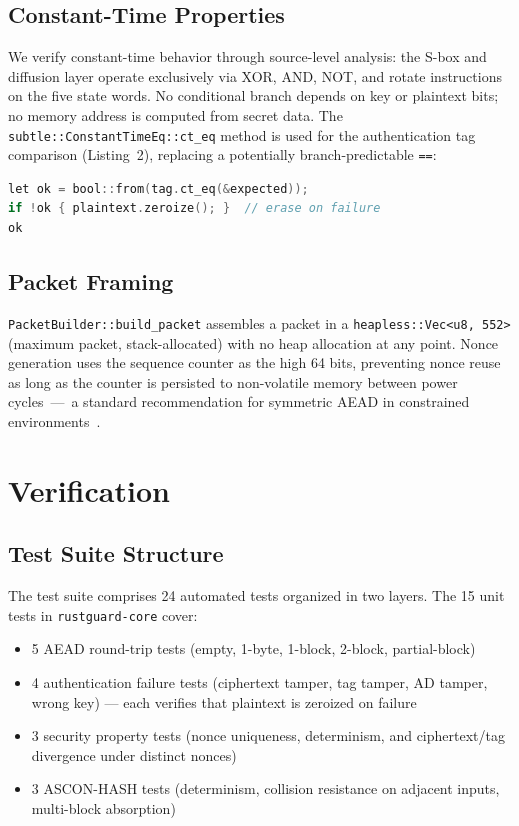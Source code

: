\documentclass[conference]{IEEEtran}
\begin{document}
\subsection{Constant-Time Properties}

We verify constant-time behavior through source-level analysis:
the S-box and diffusion layer operate exclusively via XOR, AND, NOT, and
rotate instructions on the five state words. No conditional branch depends on
key or plaintext bits; no memory address is computed from secret data.
The \texttt{subtle::ConstantTimeEq::ct\_eq} method is used for the
authentication tag comparison (Listing~2), replacing a
potentially branch-predictable \texttt{==}:

\begin{lstlisting}[language=C,caption={Constant-time tag verification.}]
let ok = bool::from(tag.ct_eq(&expected));
if !ok { plaintext.zeroize(); }  // erase on failure
ok
\end{lstlisting}

\subsection{Packet Framing}

\texttt{PacketBuilder::build\_packet} assembles a packet in a
\texttt{heapless::Vec<u8, 552>} (maximum packet, stack-allocated) with no
heap allocation at any point. Nonce generation uses the sequence counter as
the high 64 bits, preventing nonce reuse as long as the counter is persisted
to non-volatile memory between power cycles~---~a standard recommendation for
symmetric AEAD in constrained environments~\cite{b9}.

\section{Verification}
\label{sec:verification}

\subsection{Test Suite Structure}

The test suite comprises 24 automated tests organized in two layers.
The 15 unit tests in \texttt{rustguard-core} cover:
\begin{itemize}
  \item 5 AEAD round-trip tests (empty, 1-byte, 1-block, 2-block, partial-block)
  \item 4 authentication failure tests (ciphertext tamper, tag tamper, AD
        tamper, wrong key) --- each verifies that plaintext is zeroized on failure
  \item 3 security property tests (nonce uniqueness, determinism, and
        ciphertext/tag divergence under distinct nonces)
  \item 3 ASCON-HASH tests (determinism, collision resistance on adjacent
        inputs, multi-block absorption)
\end{itemize}
\end{document}
